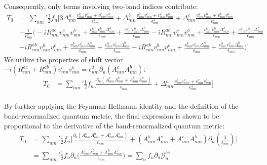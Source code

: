 \documentclass[twocolumn, prx, reprint, amsfonts, amsmath, amssymb, longbibliography, floatfix, aps]{revtex4-2}
\begin{document}
Consequently, only terms involving two-band indices contribute:
\begin{equation}
	\begin{aligned}
		T_0
		&= {\textstyle \sum_{nm}'} \frac{1}{2}f_n\Big[3\Delta^a_{mn}\frac{v^{b}_{nm}v^{c}_{mn} + v^{c}_{nm}v^{b}_{mn}}{\epsilon_{nm}^4} +  \Delta^b_{mn}\frac{v^{a}_{nm}v^{c}_{mn} + v^{c}_{nm}v^{a}_{mn}}{\epsilon_{nm}^4}+ \Delta^c_{mn}\frac{v^{a}_{nm}v^{b}_{mn} + v^{b}_{nm}v^{a}_{mn}}{\epsilon_{nm}^4} \\
		& - \frac{1}{\epsilon^3_{mn}} \Big(-i R^{ac}_{nm}v^{c}_{nm} v^{b}_{mn} + \frac{v^c_{nm}v^b_{mn} \Delta_{nm}^a}{\epsilon_{nm}} + \frac{v^a_{nm}v^b_{mn} \Delta_{nm}^c}{\epsilon_{nm}} -i R^{ac}_{mn}v^{c}_{mn} v^{b}_{nm} + \frac{v^c_{mn}v^b_{nm} \Delta_{mn}^a}{\epsilon_{mn}} + \frac{v^a_{mn}v^b_{nm} \Delta_{mn}^c}{\epsilon_{mn}}\\
		& -i R^{ab}_{nm}v^{b}_{nm} v^{c}_{mn} + \frac{v^b_{nm}v^c_{mn} \Delta_{nm}^a}{\epsilon_{nm}} + \frac{v^a_{nm}v^c_{mn} \Delta_{nm}^b}{\epsilon_{nm}} -i R^{ab}_{mn}v^{b}_{mn} v^{c}_{nm}+ \frac{v^b_{mn}v^c_{nm} \Delta_{mn}^a}{\epsilon_{mn}} + \frac{v^a_{mn}v^c_{nm} \Delta_{mn}^b}{\epsilon_{mn}}\Big)\Big]
	\end{aligned}
\end{equation}
We utilize the properties of shift vector $-i(R^{ac}_{nm} + R^{ab}_{mn})v^c_{nm}v^{b}_{mn} = \epsilon^2_{nm} \partial_a (A^c_{nm}A^b_{mn})$:
\begin{equation}
	\begin{aligned}
		T_0
		&= {\textstyle \sum_{nm}'}\frac{1}{2}f_n\Big[ \frac{\partial_a (A^{c}_{nm}A^{b}_{mn} + A^{b}_{nm}A^{c}_{mn})}{\epsilon_{nm}} +\Delta^a_{mn}\frac{v^{b}_{nm}v^{c}_{mn} + v^{c}_{nm}v^{b}_{mn}}{\epsilon_{nm}^4}\Big] \\
	\end{aligned}
\end{equation}

By further applying the Feynman-Hellmann identity and the definition of the band-renormalized quantum metric, the final expression is shown to be proportional to the derivative of the band-renormalized quantum metric:
\begin{equation}
	\begin{aligned}
		T_0
		&= {\textstyle \sum_{nm}'} \frac{1}{2}f_n\Big[ \frac{\partial_a (A^{c}_{nm}A^{b}_{mn} + A^{b}_{nm}A^{c}_{mn})}{\epsilon_{nm}} + (A^{b}_{nm}A^{c}_{mn} + A^{c}_{nm}A^{b}_{mn})\partial_a(\frac{1}{\epsilon_{nm}})\Big] \\
		&= {\textstyle \sum_{nm}'} \frac{1}{2}f_n \partial_a \Big(\frac{A^{c}_{nm}A^{b}_{mn} + A^{b}_{nm}A^{c}_{mn}}{\epsilon_{nm}}\Big) = {\textstyle \sum_{n}}f_n \partial_a \mathcal{G}^{bc}_{n} \\
	\end{aligned}
\end{equation}
\end{document}
